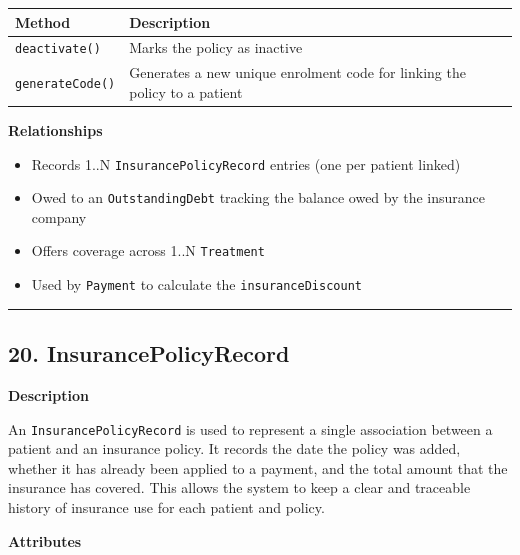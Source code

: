 \documentclass[12pt, a4paper]{article}
\begin{document}
\begin{center}
\small
\renewcommand{\arraystretch}{1.35}
\begin{tabularx}{\textwidth}{|M|Y|}
\hline
{}
\textbf{Method} & \textbf{Description} \\ \hline
\texttt{deactivate()} & Marks the policy as inactive \\ \hline
\texttt{generateCode()} & Generates a new unique enrolment code for linking the policy to a patient \\ \hline
\end{tabularx}
\end{center}

\textbf{Relationships}

\begin{itemize}
    \item Records 1..N \texttt{InsurancePolicyRecord} entries (one per patient linked)
    \item Owed to an \texttt{OutstandingDebt} tracking the balance owed by the insurance company
    \item Offers coverage across 1..N \texttt{Treatment}
    \item Used by \texttt{Payment} to calculate the \texttt{insuranceDiscount}
\end{itemize}

\par\medskip\hrule\medskip

\subsection{20. InsurancePolicyRecord}\label{sec:20-insurancepolicyrecord}

\textbf{Description}

An \texttt{InsurancePolicyRecord} is used to represent a single association between a patient and an insurance policy. It records the date the policy was added, whether it has already been applied to a payment, and the total amount that the insurance has covered. This allows the system to keep a clear and traceable history of insurance use for each patient and policy.

\textbf{Attributes}
\end{document}
